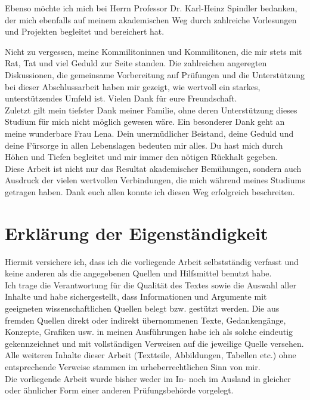 \documentclass[a4paper,oneside, 11pt, openany%
]{article}
\theoremstyle{custom}
\theoremstyle{custom}
\begin{document}
	Ebenso möchte ich mich bei Herrn Professor Dr. Karl-Heinz Spindler bedanken, der mich ebenfalls auf meinem akademischen Weg durch zahlreiche Vorlesungen und Projekten begleitet und bereichert hat.
	
	Nicht zu vergessen, meine Kommilitoninnen und Kommilitonen, die mir stets mit Rat, Tat und viel Geduld zur Seite standen. Die zahlreichen angeregten Diskussionen, die gemeinsame Vorbereitung auf Prüfungen und die Unterstützung bei dieser Abschlussarbeit haben mir gezeigt, wie wertvoll ein starkes, unterstützendes Umfeld ist. Vielen Dank für eure Freundschaft.\\
	
	Zuletzt gilt mein tiefster Dank meiner Familie, ohne deren Unterstützung dieses Studium für mich nicht möglich gewesen wäre. Ein besonderer Dank geht an meine wunderbare Frau Lena. Dein unermüdlicher Beistand, deine Geduld und deine Fürsorge in allen Lebenslagen bedeuten mir alles. Du hast mich durch Höhen und Tiefen begleitet und mir immer den nötigen Rückhalt gegeben.\\
	
	Diese Arbeit ist nicht nur das Resultat akademischer Bemühungen, sondern auch Ausdruck der vielen wertvollen Verbindungen, die mich während meines Studiums getragen haben. Dank euch allen konnte ich diesen Weg erfolgreich beschreiten.
		\newpage
		\section*{Erklärung der Eigenständigkeit}
		Hiermit versichere ich, dass ich die vorliegende Arbeit selbstständig verfasst und keine anderen als die angegebenen Quellen und Hilfsmittel benutzt
		habe.\\
		
		Ich trage die Verantwortung für die Qualität des Textes sowie die Auswahl aller Inhalte und
		habe sichergestellt, dass Informationen und Argumente mit geeigneten wissenschaftlichen
		Quellen belegt bzw. gestützt werden. Die aus fremden Quellen direkt oder indirekt
		übernommenen Texte, Gedankengänge, Konzepte, Grafiken usw. in meinen Ausführungen
		habe ich als solche eindeutig gekennzeichnet und mit vollständigen Verweisen auf die
		jeweilige Quelle versehen. Alle weiteren Inhalte dieser Arbeit (Textteile, Abbildungen,
		Tabellen etc.) ohne entsprechende Verweise stammen im urheberrechtlichen Sinn von mir.\\
		
		Die vorliegende Arbeit wurde bisher weder im In- noch im Ausland in gleicher oder ähnlicher
		Form einer anderen Prüfungsbehörde vorgelegt.\\
		
\end{document}
